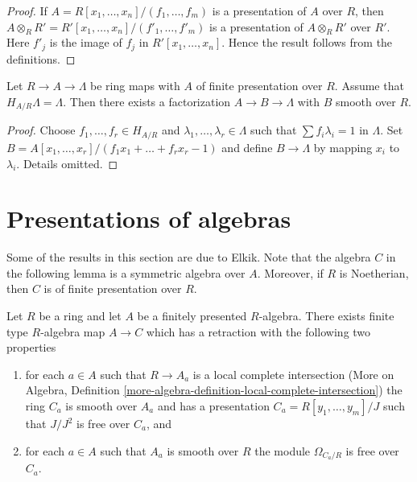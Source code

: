 \begin{proof}
If $A = R[x_1, \ldots, x_n]/(f_1, \ldots, f_m)$ is a presentation
of $A$ over $R$, then
$A \otimes_R R' = R'[x_1, \ldots, x_n]/(f'_1, \ldots, f'_m)$
is a presentation of $A \otimes_R R'$ over $R'$. Here $f'_j$ is
the image of $f_j$ in $R'[x_1, \ldots, x_n]$.
Hence the result follows from the definitions.
\end{proof}

\begin{lemma}
\label{lemma-final-solve}
Let $R \to A \to \Lambda$ be ring maps with $A$ of finite presentation
over $R$. Assume that $H_{A/R} \Lambda = \Lambda$. Then there exists
a factorization $A \to B \to \Lambda$ with $B$ smooth over $R$.
\end{lemma}

\begin{proof}
Choose $f_1, \ldots, f_r \in H_{A/R}$ and
$\lambda_1, \ldots, \lambda_r \in \Lambda$ such that
$\sum f_i\lambda_i = 1$ in $\Lambda$. Set
$B = A[x_1, \ldots, x_r]/(f_1x_1 + \ldots + f_rx_r - 1)$
and define $B \to \Lambda$ by mapping $x_i$ to $\lambda_i$.
Details omitted.
\end{proof}





\section{Presentations of algebras}
\label{section-presentations}

\noindent
Some of the results in this section are due to Elkik. Note that the algebra
$C$ in the following lemma is a symmetric algebra over $A$. Moreover, if
$R$ is Noetherian, then $C$ is of finite presentation over $R$.

\begin{lemma}
\label{lemma-improve-presentation}
Let $R$ be a ring and let $A$ be a finitely presented $R$-algebra.
There exists finite type $R$-algebra map $A \to C$ which has a
retraction with the following two properties
\begin{enumerate}
\item for each $a \in A$ such that $R \to A_a$ is a local complete
intersection (More on Algebra, Definition
\ref{more-algebra-definition-local-complete-intersection})
the ring $C_a$ is smooth over $A_a$ and has a presentation
$C_a = R[y_1, \ldots, y_m]/J$ such that $J/J^2$ is free over $C_a$, and
\item for each $a \in A$ such that $A_a$ is smooth over $R$ the
module $\Omega_{C_a/R}$ is free over $C_a$.
\end{enumerate}
\end{lemma}

